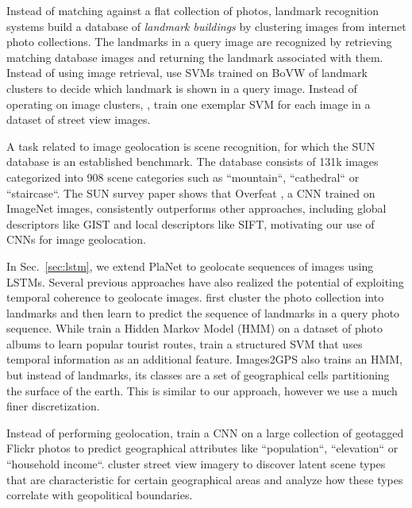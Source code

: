 \documentclass[10pt,twocolumn,letterpaper]{article}
\begin{document}
Instead of matching against a flat collection of photos, landmark
recognition systems
\cite{Avrithis10MM,Gammeter09ICCV,Johns11ICCV,Quack08CIVR,Zheng09CVPR}
build a database of \emph{landmark buildings} by clustering images
from internet photo collections. The landmarks in a query image are
recognized by retrieving matching database images and returning the
landmark associated with them.
Instead of using image retrieval, \cite{Bergamo13CVPR,Li09CVPR} use
SVMs trained on BoVW of landmark clusters to decide which landmark is
shown in a query image. Instead of operating on image clusters,
\cite{Gronat13CVPR}, train one exemplar SVM for each image in a
dataset of street view images.

A task related to image geolocation is scene recognition, for
which the SUN database \cite{Xiao14IJCV} is an established benchmark.
The database consists of 131k images categorized into 908 scene
categories such as ``mountain``, ``cathedral`` or ``staircase``. The SUN
survey paper \cite{Xiao14IJCV} shows that Overfeat \cite{Sermanet14ICLR}, a CNN trained on
ImageNet \cite{Deng09CVPR} images, consistently outperforms other approaches, including
global descriptors like GIST and local descriptors like SIFT,
motivating our use of CNNs for image geolocation.

In Sec.~\ref{sec:lstm}, we extend PlaNet to geolocate
sequences of images using LSTMs. Several previous approaches have also
realized the potential of exploiting temporal coherence to
geolocate images.
\cite{Chen11CVPRb,Li09CVPR} first cluster the photo collection into
landmarks and then learn to predict the sequence of landmarks in a
query photo sequence.  While \cite{Chen11CVPRb} train a Hidden Markov
Model (HMM) on a dataset of photo albums to learn popular tourist
routes, \cite{Li09CVPR} train a structured SVM that uses temporal
information as an additional feature.
Images2GPS \cite{Kalogerakis09ICCV} also trains an HMM, but instead of
landmarks, its classes are a set of geographical cells partitioning
the surface of the earth. This is similar to our approach, however we
use  a much finer discretization.

Instead of performing geolocation, \cite{Zhang15WACV} train a CNN on a
large collection of geotagged Flickr photos to predict geographical
attributes like ``population``, ``elevation`` or ``household
income``. \cite{Frey14WACV} cluster street view imagery to discover
latent scene types that are characteristic for certain geographical
areas and analyze how these types correlate with geopolitical boundaries.
\end{document}
